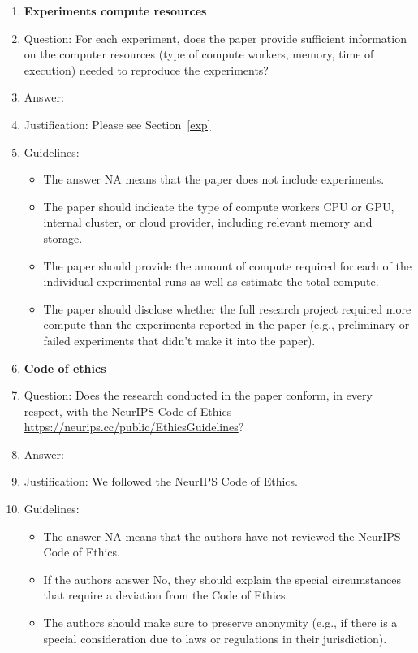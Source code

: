 \documentclass{article}
\theoremstyle{plain}
\theoremstyle{definition}
\theoremstyle{remark}
\begin{document}
\begin{enumerate}
\item {\bf Experiments compute resources}
    \item[] Question: For each experiment, does the paper provide sufficient information on the computer resources (type of compute workers, memory, time of execution) needed to reproduce the experiments?
    \item[] Answer: \answerYes{} %
    \item[] Justification: Please see Section~\ref{exp}
    \item[] Guidelines:
    \begin{itemize}
        \item The answer NA means that the paper does not include experiments.
        \item The paper should indicate the type of compute workers CPU or GPU, internal cluster, or cloud provider, including relevant memory and storage.
        \item The paper should provide the amount of compute required for each of the individual experimental runs as well as estimate the total compute. 
        \item The paper should disclose whether the full research project required more compute than the experiments reported in the paper (e.g., preliminary or failed experiments that didn't make it into the paper). 
    \end{itemize}
    
\item {\bf Code of ethics}
    \item[] Question: Does the research conducted in the paper conform, in every respect, with the NeurIPS Code of Ethics \url{https://neurips.cc/public/EthicsGuidelines}?
    \item[] Answer: \answerYes{} %
    \item[] Justification: We followed the NeurIPS Code of Ethics.
    \item[] Guidelines:
    \begin{itemize}
        \item The answer NA means that the authors have not reviewed the NeurIPS Code of Ethics.
        \item If the authors answer No, they should explain the special circumstances that require a deviation from the Code of Ethics.
        \item The authors should make sure to preserve anonymity (e.g., if there is a special consideration due to laws or regulations in their jurisdiction).
    \end{itemize}



\end{enumerate}
\end{document}
